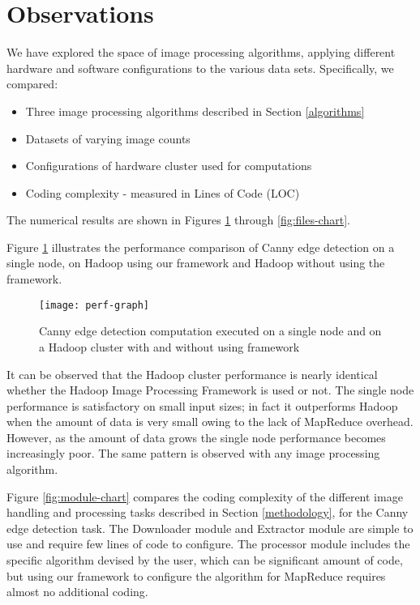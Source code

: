 \section{Observations}   

We have explored the space of image processing algorithms, applying
different hardware and software configurations to the various data
sets.  Specifically, we compared:

\begin{itemize}
	\item Three image processing algorithms described in Section
	\ref{algorithms}
	\item Datasets of varying image counts
	\item Configurations of hardware cluster used for computations 
	\item Coding complexity - measured in Lines of Code (LOC)
\end{itemize}

The numerical results are shown in Figures \ref{fig:perf-chart}
through \ref{fig:files-chart}.

Figure \ref{fig:perf-chart} illustrates the performance comparison of
Canny edge detection on a single node, on Hadoop using our framework
and Hadoop without using the framework.

\begin{figure}[h]
	\centering
	\texttt{[image: perf-graph]}
	\caption{Canny edge detection computation executed on a single node
		and on a Hadoop cluster with and without using framework}
	\label{fig:perf-chart}
\end{figure}

It can be observed that the Hadoop cluster performance is nearly
identical whether the Hadoop Image Processing Framework is used or
not.  The single node performance is satisfactory on small input
sizes; in fact it outperforms Hadoop when the amount of data is very
small owing to the lack of MapReduce overhead.  However, as the amount
of data grows the single node performance becomes increasingly poor.
The same pattern is observed with any image processing algorithm.

Figure \ref{fig:module-chart} compares the coding complexity of the
different image handling and processing tasks described in Section
\ref{methodology}, for the Canny edge detection task. The Downloader
module and Extractor module are simple to use and require few lines of
code to configure. The processor module includes the specific
algorithm devised by the user, which can be significant amount of
code, but using our framework to configure the algorithm for MapReduce
requires almost no additional coding.

